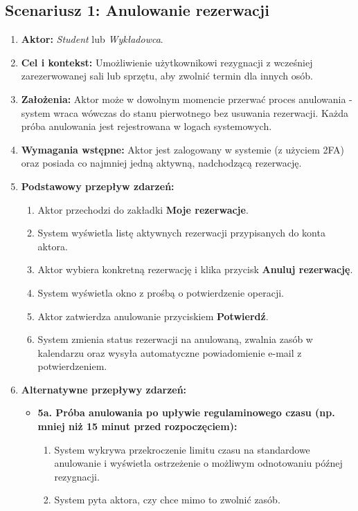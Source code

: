 \documentclass[11pt, a4paper]{article}
\begin{document}
\subsection{Scenariusz 1: Anulowanie rezerwacji}
\begin{enumerate}
    \item \textbf{Aktor:} \textit{Student} lub \textit{Wykładowca}.
    \item \textbf{Cel i kontekst:} Umożliwienie użytkownikowi rezygnacji z wcześniej zarezerwowanej sali lub sprzętu, aby zwolnić termin dla innych osób.
    \item \textbf{Założenia:} Aktor może w dowolnym momencie przerwać proces anulowania - system wraca wówczas do stanu pierwotnego bez usuwania rezerwacji. Każda próba anulowania jest rejestrowana w logach systemowych.
    \item \textbf{Wymagania wstępne:} Aktor jest zalogowany w systemie (z użyciem 2FA) oraz posiada co najmniej jedną aktywną, nadchodzącą rezerwację.
    \item \textbf{Podstawowy przepływ zdarzeń:}
    \begin{enumerate}
        \item Aktor przechodzi do zakładki \textbf{Moje rezerwacje}.
        \item System wyświetla listę aktywnych rezerwacji przypisanych do konta aktora.
        \item Aktor wybiera konkretną rezerwację i klika przycisk \textbf{Anuluj rezerwację}.
        \item System wyświetla okno z prośbą o potwierdzenie operacji.
        \item Aktor zatwierdza anulowanie przyciskiem \textbf{Potwierdź}.
        \item System zmienia status rezerwacji na anulowaną, zwalnia zasób w kalendarzu oraz wysyła automatyczne powiadomienie e-mail z potwierdzeniem.
    \end{enumerate}
    \item \textbf{Alternatywne przepływy zdarzeń:}
    \begin{itemize}
        \item \textbf{5a. Próba anulowania po upływie regulaminowego czasu (np. mniej niż 15 minut przed rozpoczęciem):}
        \begin{enumerate}
            \item System wykrywa przekroczenie limitu czasu na standardowe anulowanie i wyświetla ostrzeżenie o możliwym odnotowaniu późnej rezygnacji.
            \item System pyta aktora, czy chce mimo to zwolnić zasób.

\end{enumerate}
\end{itemize}
\end{enumerate}
\end{document}
